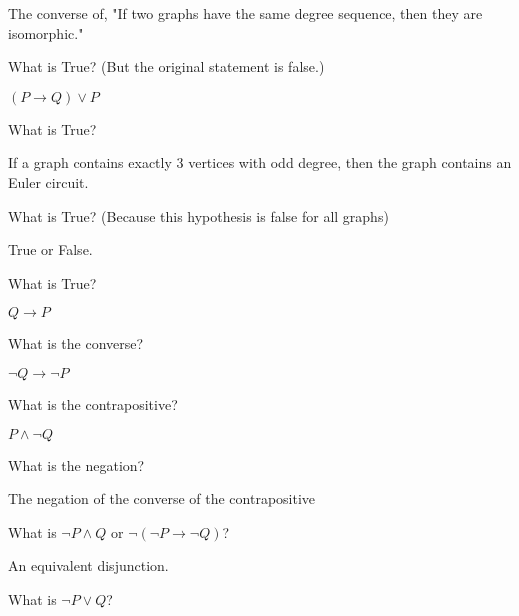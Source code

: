 \documentclass[10pt]{exam}
\begin{document}
\begin{questions}
\question The converse of, "If two graphs have the same degree sequence, then they are isomorphic."

\begin{solution}
  What is True? (But the original statement is false.)
\end{solution}


\question \((P \rightarrow Q) \vee P\)

\begin{solution}
	What is True?
\end{solution}

% 
% 


\question If a graph contains exactly 3 vertices with odd degree, then the graph contains an Euler circuit.

\begin{solution}
	What is True? (Because this hypothesis is false for all graphs)
\end{solution}


\question True or False.

\begin{solution}
  What is True?
\end{solution}

\newpage



\question \(Q\rightarrow P\)
\begin{solution}
	What is the converse?
\end{solution}

\question \(\neg Q \rightarrow \neg P\)
\begin{solution}
	What is the contrapositive?
\end{solution}

\question \(P \wedge \neg Q\)
\begin{solution}
	What is the negation?
\end{solution}

\question The negation of the converse of the contrapositive
\begin{solution}
	What is \(\neg P \wedge Q\) or \(\neg (\neg P\rightarrow \neg Q)\)?
\end{solution}

\question An equivalent disjunction.
\begin{solution}
	What is \(\neg P \vee Q\)?
\end{solution}



\end{questions}
\end{document}
